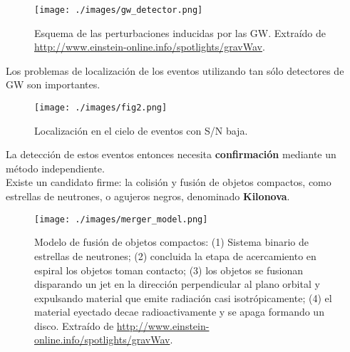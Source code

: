 \documentclass[10pt]{beamer}
\begin{document}
\begin{frame}
\begin{figure}[h]  %
   \begin{center}
 \texttt{[image: ./images/gw\_detector.png]}
  \caption{\scriptsize{Esquema de las perturbaciones inducidas por las GW. Extra\'{i}do de \url{http://www.einstein-online.info/spotlights/gravWav}.}}
\end{center}
 \end{figure}
\end{frame}
\begin{frame}
Los problemas de localizaci\'on de los eventos utilizando tan s\'olo detectores de GW son importantes.
\begin{figure}[h]
 \centering
 \texttt{[image: ./images/fig2.png]}
 \caption{\scriptsize{Localizaci\'on en el cielo de eventos con S/N baja.}} 
\end{figure}
\end{frame}
\begin{frame}
La detecci\'on de estos eventos entonces necesita \textbf{confirmaci\'on} mediante un m\'etodo independiente.\\
\bigskip
Existe un candidato firme: la colisi\'on y fusi\'on de objetos compactos, como estrellas de neutrones, o 
agujeros negros, denominado \textbf{Kilonova}.\\

\begin{figure}[h]
 \centering
 \texttt{[image: ./images/merger\_model.png]}
 \caption{\scriptsize{Modelo de fusi\'on de objetos compactos: (1) Sistema binario de estrellas de neutrones; 
 (2) concluida la etapa de acercamiento en espiral los objetos toman contacto; 
 (3) los objetos se fusionan disparando un jet en la direcci\'on perpendicular al plano orbital y expulsando material que emite radiaci\'on casi isotr\'opicamente; 
 (4) el material eyectado decae radioactivamente y se apaga formando un disco. Extra\'{i}do de \url{http://www.einstein-online.info/spotlights/gravWav}.}}
\end{figure}
\end{frame}
\end{document}
